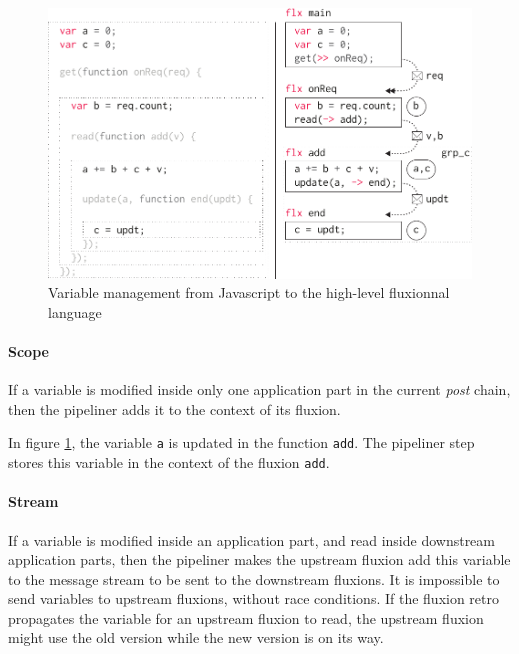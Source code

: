 \begin{figure}[h!]
\begin{center}
  \includegraphics[width=\linewidth]{resources/states.pdf}
  \caption{Variable management from Javascript to the high-level fluxionnal language}
  \label{fig:states}
\end{center}
\end{figure}

\paragraph{Scope}
If a variable is modified inside only one application part in the current \textit{post} chain, then the pipeliner adds it to the context of its fluxion.

In figure \ref{fig:states}, the variable \texttt{a} is updated in the function \texttt{add}.
The pipeliner step stores this variable in the context of the fluxion \texttt{add}.

\paragraph{Stream}
If a variable is modified inside an application part, and read inside downstream application parts, then the pipeliner makes the upstream fluxion add this variable to the message stream to be sent to the downstream fluxions.
It is impossible to send variables to upstream flux\-ions, without race conditions.
If the fluxion retro propagates the variable for an upstream fluxion to read, the upstream fluxion might use the old version while the new version is on its way.

